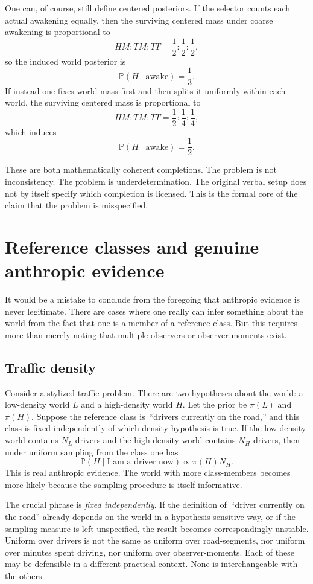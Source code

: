 \documentclass[11pt]{article}
\newcommand{\Pp}{\mathbb{P}}
\newcommand{\1}{\mathbf{1}}
\begin{document}
One can, of course, still define centered posteriors. If the selector counts each actual awakening equally, then the surviving centered mass under coarse awakening is proportional to
\[
HM : TM : TT = \frac{1}{2} : \frac{1}{2} : \frac{1}{2},
\]
so the induced world posterior is
\[
\Pp(H \mid \text{awake}) = \frac{1}{3}.
\]
If instead one fixes world mass first and then splits it uniformly within each world, the surviving centered mass is proportional to
\[
HM : TM : TT = \frac{1}{2} : \frac{1}{4} : \frac{1}{4},
\]
which induces
\[
\Pp(H \mid \text{awake}) = \frac{1}{2}.
\]

These are both mathematically coherent completions. The problem is not inconsistency. The problem is underdetermination. The original verbal setup does not by itself specify which completion is licensed. This is the formal core of the claim that the problem is misspecified.

\section{Reference classes and genuine anthropic evidence}

It would be a mistake to conclude from the foregoing that anthropic evidence is never legitimate. There are cases where one really can infer something about the world from the fact that one is a member of a reference class. But this requires more than merely noting that multiple observers or observer-moments exist.

\subsection{Traffic density}

Consider a stylized traffic problem. There are two hypotheses about the world: a low-density world $L$ and a high-density world $H$. Let the prior be $\pi(L)$ and $\pi(H)$. Suppose the reference class is \,``drivers currently on the road,'' and this class is fixed independently of which density hypothesis is true. If the low-density world contains $N_L$ drivers and the high-density world contains $N_H$ drivers, then under uniform sampling from the class one has
\[
\Pp(H \mid \text{I am a driver now}) \propto \pi(H) N_H.
\]
This is real anthropic evidence. The world with more class-members becomes more likely because the sampling procedure is itself informative.

The crucial phrase is \emph{fixed independently}. If the definition of \,``driver currently on the road'' already depends on the world in a hypothesis-sensitive way, or if the sampling measure is left unspecified, the result becomes correspondingly unstable. Uniform over drivers is not the same as uniform over road-segments, nor uniform over minutes spent driving, nor uniform over observer-moments. Each of these may be defensible in a different practical context. None is interchangeable with the others.
\end{document}
